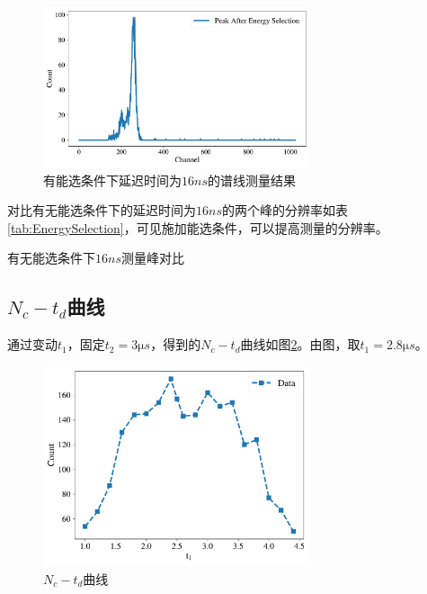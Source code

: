 \documentclass{article}
\begin{document}
\begin{figure}[htbp]
    \centering
    \includegraphics[width=0.7\textwidth]{../plots/EnergySelection.pdf}
    \caption{有能选条件下延迟时间为$16\si{ns}$的谱线测量结果\label{fig:EnergySelection}}
\end{figure}

对比有无能选条件下的延迟时间为$16\si{ns}$的两个峰的分辨率如表\ref{tab:EnergySelection}，可见施加能选条件，可以提高测量的分辨率。

\begin{table}[htbp]
    \centering
    \caption{有无能选条件下$16\si{ns}$测量峰对比\label{tab:EnergySelection}}
    
\end{table}
\subsection{$N_c-t_d$曲线}
通过变动$t_1$，固定$t_2 = 3\si{\micro s}$，得到的$N_c-t_d$曲线如图\ref{fig:Nc_td}。由图，取$t_1 = 2.8\si{\micro s}$。
\begin{figure}[htbp]
    \centering
    \includegraphics[width=0.7\textwidth]{../plots/Nc_Td.pdf}
    \caption{$N_c-t_d$曲线\label{fig:Nc_td}}
\end{figure}
\end{document}
